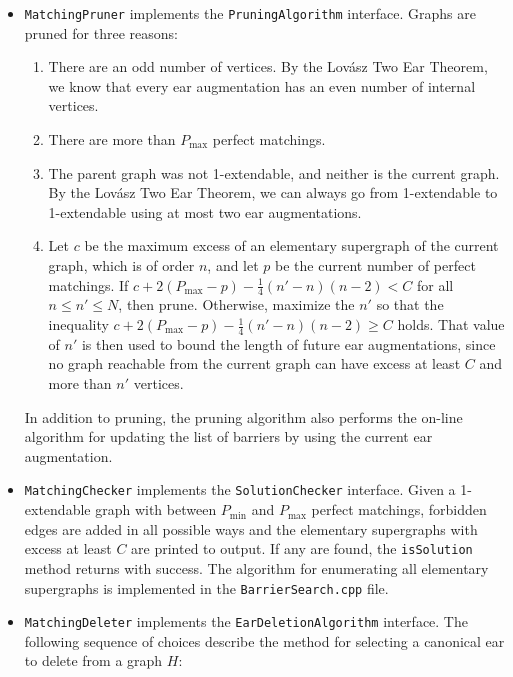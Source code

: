 \documentclass[11pt]{article}
\begin{document}
\begin{itemize}
	\item \texttt{MatchingPruner} implements the 
		\texttt{PruningAlgorithm} interface.
		Graphs are pruned for three reasons:
		
		\begin{enumerate}
			\item There are an odd number of vertices.
				By the Lov\'asz Two Ear Theorem, we know 
					that every ear augmentation 
					has an even number of internal vertices.
					
			\item There are more than $P_{\max}$ perfect matchings.
			
			\item The parent graph was not 1-extendable, and neither is the current graph.
				By the Lov\'asz Two Ear Theorem, we can always go from 1-extendable
				to 1-extendable using at most two ear augmentations.
				
			\item Let $c$ be the maximum excess of an elementary supergraph
				of the current graph, which is of order $n$,
				and let $p$ be the current number of perfect matchings.
				If $c+2(P_{\max}-p)-\frac{1}{4}(n'-n)(n-2) < C$
				for all $n \leq n' \leq N$, then prune.
				Otherwise, maximize the $n'$ so that 
					the inequality 
					$c+2(P_{\max}-p)-\frac{1}{4}(n'-n)(n-2) \geq C$ holds.
				That value of $n'$ is then used to bound the 
					length of future ear augmentations,
					since no graph reachable from the current graph
					can have excess at least $C$ and more than $n'$ vertices.
		\end{enumerate}
		
		In addition to pruning, the pruning algorithm
			also performs the on-line algorithm
			for updating the list of barriers by using the current ear 
			augmentation.
		
	\item \texttt{MatchingChecker} implements the
		\texttt{SolutionChecker} interface.
		Given a 1-extendable graph with between $P_{\min}$ and $P_{\max}$
			perfect matchings, 
			forbidden edges are added in all possible ways
			and the elementary supergraphs with excess at least $C$
			are printed to output.
		If any are found, the \texttt{isSolution} method returns with success.
		The algorithm for enumerating all 
			elementary supergraphs is implemented in the
			\texttt{BarrierSearch.cpp} file.
		
	\item \texttt{MatchingDeleter} implements the
		\texttt{EarDeletionAlgorithm} interface.
		The following sequence of choices 
			describe the method for selecting 
			a canonical ear to delete from a graph $H$:
		

\end{itemize}
\end{document}
